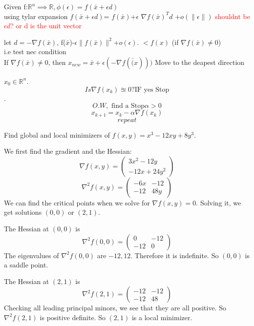\begin{problem}
    Given f:$\mathbb{R}^n \implies \mathbb{R}, \phi(\epsilon)=f(\bar{x}+\epsilon d)$ 
    \\ using tylar expansion 
    $f(\bar{x}+\epsilon d)$=
    $f(\bar{x})$+$\epsilon$ $\nabla f(\bar{x})^T d$ +$o(\|\epsilon\|)$ \textcolor{red}{shouldnt be $\epsilon d$? or d is the unit vector}

    let $d=-\nabla f(\bar{x})$, f($\bar{x}$)-$\epsilon \| f(\bar{x})\|^2$+$o(\epsilon)$.
    $<f(x)$ (if $\nabla f(\bar{x})\neq 0$)
    \\ i.e test nec condition 
    \\ If $\nabla f(\bar{x})\neq 0$, then $x_{new}=\bar{x}+\epsilon(-\nabla f(\bar(x)))$
    Move to the deapest direction


    
\end{problem}

\begin{definition}
    $x_{0} \in \mathbb{R}^n$.   
    $$Is \nabla f(x_k)\approxeq 0?\text{IF yes Stop}$$.
    $$O.W, \text{ find a Stop} \alpha >0$$
    $$x_{k+1}=x_k-\alpha\nabla f(x_k)$$
    $$repeat$$
\end{definition}

\begin{problem}
    Find global and local minimizers of $f(x,y) = x^3 - 12xy + 8y^3$.
  
    \bigskip
    We first find the gradient and the Hessian:
    $$\nabla f(x,y) = \begin{pmatrix}
      3x^2 - 12y \\
      -12x + 24y^2
    \end{pmatrix}$$
    $$\nabla^2 f(x,y) = \begin{pmatrix}
      -6x & -12 \\
      -12 & 48y
    \end{pmatrix}$$
    We can find the critical points when we solve for $\nabla f(x,y) = 0$. Solving it, we get solutions $(0,0)$ or $(2,1)$.
  
    The Hessian at $(0,0)$ is $$\nabla^2 f(0,0) = \begin{pmatrix}
      0 & -12 \\
      -12 & 0
    \end{pmatrix}$$ The eigenvalues of $\nabla^2 f(0,0)$ are $-12, 12$. Therefore it is indefinite. So $(0,0)$ is a saddle point.
  
    The Hessian at $(2,1)$ is $$\nabla^2 f(2,1) = \begin{pmatrix}
      -12 & -12 \\
      -12 & 48
    \end{pmatrix}$$ Checking all leading principal minors, we see that they are all positive. So $\nabla^2 f(2,1)$ is positive definite. So $(2,1)$ is a local minimizer.
  \end{problem}

% 